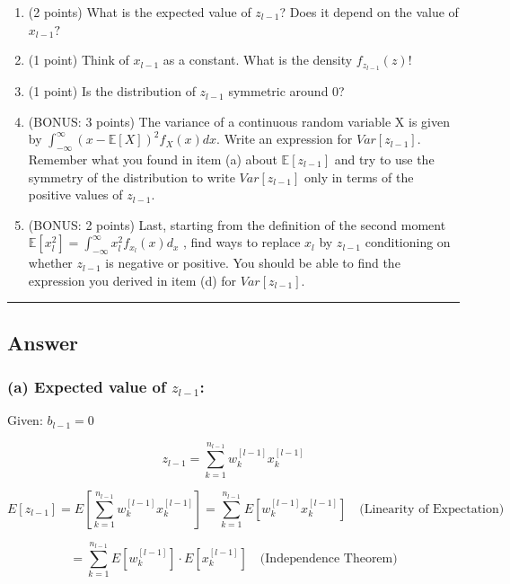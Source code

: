 \documentclass[
  letterpaper,
  DIV=11,
  numbers=noendperiod]{scrartcl}
\begin{document}
\begin{enumerate}
\def\labelenumi{(\alph{enumi})}
\item
  (2 points) What is the expected value of \({z_{l-1}}\)? Does it depend
  on the value of \({x_{l-1}}?\)
\item
  (1 point) Think of \(x_{l-1}\) as a constant. What is the density
  \(f_{z_{l-1}}(z)!\)
\item
  (1 point) Is the distribution of \(z_{l-1}\) symmetric around 0?
\item
  (BONUS: 3 points) The variance of a continuous random variable X is
  given by \(\int_{-\infty}^{\infty}(x-\mathbb{E}[X])^{2}f_{X}(x)dx.\)
  Write an expression for \(Var[z_{l-1}]\). Remember what you found in
  item (a) about \(\mathbb{E}[z_{l-1}]\) and try to use the symmetry of
  the distribution to write \(Var[z_{l-1}]\) only in terms of the
  positive values of \(z_{l-1}\).
\item
  (BONUS: 2 points) Last, starting from the definition of the second
  moment
  \(\mathbb{E}[x_{l}^{2}]=\int_{-\infty}^{\infty}x_{l}^{2}f_{x_{l}}(x)d_{x}\)
  , find ways to replace \(x_{l}\) by \(z_{l-1}\) conditioning on
  whether \(z_{l-1}\) is negative or positive. You should be able to
  find the expression you derived in item (d) for \(Var[z_{l-1}]\).
\end{enumerate}

\begin{center}\rule{0.5\linewidth}{0.5pt}\end{center}

\subsection{Answer}\label{answer-2}

\subsubsection{\texorpdfstring{(a) Expected value of
\(z_{l-1}\):}{(a) Expected value of z\_\{l-1\}:}}\label{a-expected-value-of-z_l-1}

Given: \(b_{l-1} = 0\)

\[z_{l-1} = \sum_{k=1}^{n_{l-1}} w_k^{[l-1]} x_k^{[l-1]}\]

\[E[z_{l-1}] = E\left[\sum_{k=1}^{n_{l-1}} w_k^{[l-1]} x_k^{[l-1]}\right] = \sum_{k=1}^{n_{l-1}} E[w_k^{[l-1]} x_k^{[l-1]}] \quad \text{(Linearity of Expectation)}\]

\[= \sum_{k=1}^{n_{l-1}} E[w_k^{[l-1]}] \cdot E[x_k^{[l-1]}] \quad \text{(Independence Theorem)}\]
\end{document}
